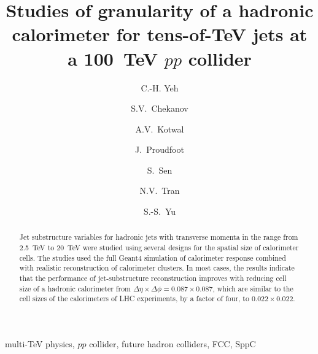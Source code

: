 \documentclass[final,1p,11pt]{elsarticle}
\begin{document}
\begin{frontmatter}

\title{
Studies of granularity of a hadronic calorimeter for tens-of-TeV jets  at a 100~TeV $pp$ collider 
}

\author[add3]{C.-H. Yeh}

\author[add1]{S.V.~Chekanov}

\author[addDuke]{A.V.~Kotwal}

\author[add1]{J.~Proudfoot}

\author[addDuke]{S.~Sen}

\author[add2]{N.V.~Tran}

\author[add3]{S.-S.~Yu}

\address[add3]{
Department of Physics and Center for High Energy and High Field Physics, 
National Central University, Chung-Li, Taoyuan City 32001, Taiwan
}

\address[add1]{
HEP Division, Argonne National Laboratory,
9700 S.~Cass Avenue,
Argonne, IL 60439, USA. 
}

\address[addDuke]{
Department of Physics, Duke University, USA
}

\address[add2]{
Fermi National Accelerator Laboratory
}




\begin{abstract}
Jet substructure variables for hadronic jets with transverse momenta in the range from 2.5~TeV to 20~TeV
were studied using several designs for the spatial size of calorimeter cells. The studies  used 
the full Geant4 simulation 
of calorimeter response combined with realistic reconstruction of calorimeter clusters.
In most cases, the results indicate that the performance of jet-substructure 
reconstruction improves with reducing cell size of a hadronic calorimeter 
from $\Delta \eta \times \Delta \phi = 0.087\times0.087$,
which are similar to the cell sizes of the calorimeters of LHC experiments, by a factor of four, to  $0.022\times0.022$.


\end{abstract}

\begin{keyword}
multi-TeV physics, $pp$ collider, future hadron colliders, FCC, SppC
\end{keyword}



\end{frontmatter}
\end{document}
